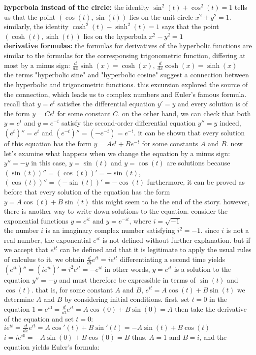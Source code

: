 \documentclass{article}
\begin{document}
\textbf{hyperbola instead of the circle:} the identity $\sin^2(t) + \cos^2(t) = 1$ tells us that the point $(\cos(t), \sin(t))$ lies on the unit circle $x^2 + y^2 = 1$. similarly, the identity $\cosh^2(t) - \sinh^2(t) = 1$ says that the point $(\cosh(t), \sinh(t))$ lies on the hyperbola $x^2 - y^2 = 1$\\

\textbf{derivative formulas:} the formulas for derivatives of the hyperbolic functions are similar to the formulas for the corresponsing trigonometric function, differing at most by a minus sign: $\frac{d}{dx}\sinh(x) = \cosh(x)$, $\frac{d}{dx}\cosh(x) = \sinh(x)$\\

the terms "hyperbolic sine" and "hyperbolic cosine" suggest a connection between the hyperbolic and trigonometric functions. this excursion explored the source of the connection, which leads us to complex numbers and Euler's famous formula.\\ recall that $y = e^t$ satisfies the differential equation $y' = y$ and every solution is of the form $y = Ce^t$ for some constant $C$. on the other hand, we can check that both $y = e^t$ and $y = e^{-t}$ satisfy the second-order differential equation $y'' = y$ indeed, $(e^t)'' = e^t$ and $(e^{-t})'' = (-e^{-t}) = e^{-t}$. it can be shown that every solution of this equation has the form $y = Ae^t + Be^{-t}$ for some constants $A$ and $B$. now let's examine what happens when we change the equation by a minus sign: $y'' = -y$ in this case, $y = \sin(t)$ and $y = \cos(t)$ are solutions because $(\sin(t))'' = (\cos(t))' = -\sin(t)$, $(\cos(t))'' = (-\sin(t))' = -\cos(t)$ furthermore, it can be proved as before that every solution of the equation has the form $y = A\cos(t) + B\sin(t)$ this might seem to be the end of the story. however, there is another way to write down solutions to the equation. consider the exponential functions $y = e^{it}$ and $y = e^{-it}$, where $i = \sqrt{-1}$\\ the number $i$ is an imaginary complex number satisfying $i^2 = -1$. since $i$ is not a real number, the exponential $e^{it}$ is not defined without further explanation. but if we accept that $e^{it}$ can be defined and that it is legitimate to apply the usual rules of calculus to it, we obtain $\frac{d}{dt}e^{it} = ie^{it}$ differentiating a second time yields $(e^{it})'' = (ie^{it})' = i^2e^{it} = -e^{it}$ in other words, $y = e^{it}$ is a solution to the equation $y'' = -y$ and must therefore be expressible in terms of $\sin(t)$ and $\cos(t)$. that is, for some constant $A$ and $B$, $e^{it} = A\cos(t) + B\sin(t)$ we determine $A$ and $B$ by considering initial conditions. first, set $t = 0$ in the equation $1 = e^{i0} = \frac{d}{dt}e^{it} = A\cos(0) + B\sin(0) = A$ then take the derivative of the equation and set $t = 0$: $ie^{it} = \frac{d}{dx}e^{it} = A\cos'(t) + B\sin'(t) = -A\sin(t) + B\cos(t)$ $i = ie^{i0} = -A\sin(0) + B\cos(0) = B$ thus, $A = 1$ and $B = i$, and the equation yields Euler's formula:\\
\end{document}
